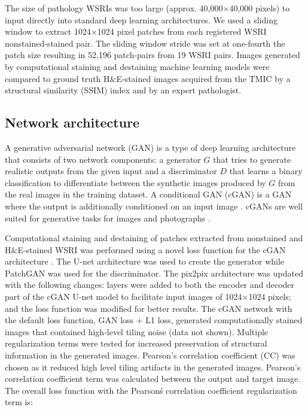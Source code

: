 \documentclass[10pt, conference, compsocconf]{IEEEtran}
\begin{document}
The size of pathology WSRIs was too large (approx. 40,000$\times$40,000 pixels) to input directly into standard deep learning architectures.  We used a sliding window to extract 1024$\times$1024 pixel patches from each registered WSRI nonstained-stained pair. The sliding window stride was set at one-fourth the patch size resulting in 52,196 patch-pairs from 19 WSRI pairs. Images generated by computational staining and destaining machine learning models were compared to ground truth H\&E-stained images acquired from the TMIC by a structural similarity (SSIM) index and by an expert pathologist.

\subsection{Network architecture}
A generative adversarial network (GAN) is a type of deep learning architecture that consists of two network components: a generator $G$ that tries to generate realistic outputs from the given input and a discriminator $D$ that learns a binary classification to differentiate between the synthetic images produced by $G$ from the real images \cite{goodfellow2014generative} in the training dataset. A conditional GAN (cGAN) is a GAN where the output is additionally conditioned on an input image \cite{cGAN_paper}. cGANs are well suited for generative tasks for images and photographs \cite{bayramoglu,cGAN_paper,neffgenerative}.

Computational staining and destaining of patches extracted from nonstained and H\&E-stained WSRI was performed using a novel loss function for the cGAN architecture \cite{cGAN_paper}. The U-net architecture was used to create the generator while PatchGAN was used for the discriminator. The pix2pix architecture was updated with the following changes: layers were added to both the encoder and decoder part of the cGAN U-net model to facilitate input images of 1024$\times$1024 pixels; and the loss function was modified for better results. The cGAN network with the default loss function, GAN loss + L1 loss, generated computationally stained images that contained high-level tiling noise (data not shown). Multiple regularization terms were tested for increased preservation of structural information in the generated images. Pearson's correlation coefficient (CC) was chosen as it reduced high level tiling artifacts in the generated images. Pearson's correlation coefficient term was calculated between the output and target image. The overall loss function with the Pearson\'s correlation coefficient regularization term is:
\end{document}
